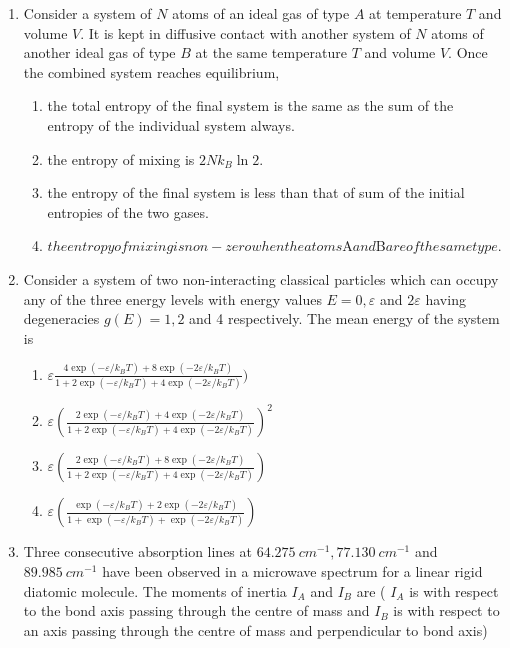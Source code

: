 \documentclass[journal]{IEEEtran}
\begin{document}
\begin{enumerate}
    

    \item  Consider a system of $N$ atoms of an ideal gas of type $A$ at temperature $T$ and volume $V$. It is kept in diffusive contact with another system of $N$ atoms of another ideal gas of type $B$ at the same temperature $T$ and volume $V$. Once the combined system reaches equilibrium,
   
            \begin{enumerate}
            \item the total entropy of the final system is the same as the sum of the entropy of the individual system always.
            \item the entropy of mixing is $2 N k_{B} \ln 2$.
            \item  the entropy of the final system is less than that of sum of the initial entropies of the two gases.
            \item $the entropy of mixing is non-zero when the atoms $A$ and $B$ are of the same type.$
            \end{enumerate}
       
    \item   Consider a system of two non-interacting classical particles which can occupy any of the three energy levels with energy values $E=0, \varepsilon$ and $2 \varepsilon$ having degeneracies $g(E)=1,2$ and 4 respectively. The mean energy of the system is
    
            \begin{enumerate}
              \item  $\varepsilon\frac{4 \exp (-\varepsilon / k_{B} T)+8 \exp (-2 \varepsilon / k_{B} T)}{1+2 \exp (-\varepsilon / k_{B} T)+4 \exp (-2 \varepsilon / k_{B} T)})$
              \item $\varepsilon(\frac{2 \exp (-\varepsilon / k_{B} T)+4 \exp (-2 \varepsilon / k_{B} T)}{1+2 \exp (-\varepsilon / k_{B} T)+4 \exp (-2 \varepsilon / k_{B} T)})^{2}$
              \item $\varepsilon(\frac{2 \exp (-\varepsilon / k_{B} T)+8 \exp (-2 \varepsilon / k_{B} T)}{1+2 \exp (-\varepsilon / k_{B} T)+4 \exp (-2 \varepsilon / k_{B} T)})$
              \item $\varepsilon(\frac{\exp (-\varepsilon / k_{B} T)+2 \exp (-2 \varepsilon / k_{B} T)}{1+\exp (-\varepsilon / k_{B} T)+\exp (-2 \varepsilon / k_{B} T)})$
            \end{enumerate}
       
    \item  Three consecutive absorption lines at $64.275 {~cm}^{-1}, 77.130 {~cm}^{-1}$ and $89.985 {~cm}^{-1}$ have been observed in a microwave spectrum for a linear rigid diatomic molecule. The moments of inertia $I_{A}$ and $I_{B}$ are ( $I_{A}$ is with respect to the bond axis passing through the centre of mass and $I_{B}$ is with respect to an axis passing through the centre of mass and perpendicular to bond axis)
   

\end{enumerate}
\end{document}
